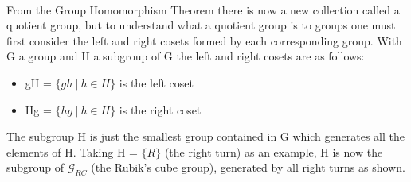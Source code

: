 \documentclass{article}
\newcounter{lem}[section]\setcounter{lem}{0}
\begin{document}
\paragraph{}From the Group Homomorphism Theorem there is now a new collection called a quotient group, but to understand what a quotient group is to groups one must first consider the left and right cosets formed by each corresponding group.	
With G a group and H a subgroup of G the left and right cosets are as follows:
\begin{itemize}
\item gH = $\{gh\ |\ h \in H\}$ is the left coset 
\item Hg = $\{hg\ |\ h \in H\}$ is the right coset 
\end{itemize}
The subgroup H is just the smallest group contained in G which generates all the elements of H. Taking H = $\{R\}$ (the right turn) as an example, H is now the subgroup of $\mathcal{G}_{RC}$ (the Rubik's cube group), generated by all right turns as shown. 
\end{document}
